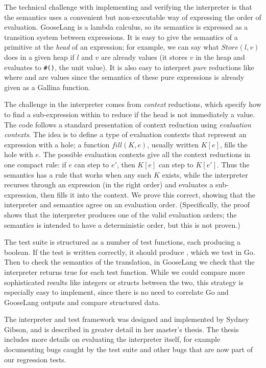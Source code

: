 The technical challenge with implementing and verifying the interpreter
is that the semantics uses a convenient but non-executable way of
expressing the order of evaluation. GooseLang is a lambda calculus, so
its semantics is expressed as a transition system between expressions.
It is easy to give the semantics of a primitive at the \emph{head} of an
expression; for example, we can say what $Store(l, v)$ does in a given
heap if $l$ and $v$ are already values (it stores $v$ in the heap
and evaluates to \texttt{\#()}, the unit value). It is also easy to
interpret \emph{pure} reductions like  where 
and  are values since the semantics of these pure expressions
is already given as a Gallina function.

The challenge in the interpreter comes from \emph{context} reductions,
which specify how to find a sub-expression within  to reduce
if the head is not immediately a value. The code follows a standard
presentation of context reduction using \emph{evaluation contexts}. The
idea is to define a type of evaluation contexts  that
represent an expression with a hole; a function $fill(K, e)$, usually
written $K[e]$, fills the hole with $e$. The possible evaluation
contexts give all the context reductions in one compact rule: if $e$
can step to $e'$, then $K[e]$ can step to $K[e']$. Thus the
semantics has a rule that works when any such $K$ exists, while the
interpreter recurses through an expression (in the right order) and
evaluates a sub-expression, then fills it into the context. We prove
this correct, showing that the interpreter and semantics agree on an
evaluation order. (Specifically, the proof shows that the interpreter
produces one of the valid evaluation orders; the semantics is intended
to have a deterministic order, but this is not proven.)

The test suite is structured as a number of test functions, each
producing a boolean. If the test is written correctly, it should produce
, which we test in Go. Then to check the semantics of the
translation, in GooseLang we check that the interpreter returns true for
each test function. While we could compare more sophisticated results
like integers or structs between the two, this strategy is especially
easy to implement, since there is no need to correlate Go and GooseLang
outputs and compare structured data.

The interpreter and test framework was designed and implemented by
Sydney Gibson, and is described in greater detail in her master's
thesis. The thesis includes more details on evaluating the interpreter
itself, for example documenting bugs caught by the test suite and other
bugs that are now part of our regression tests.
